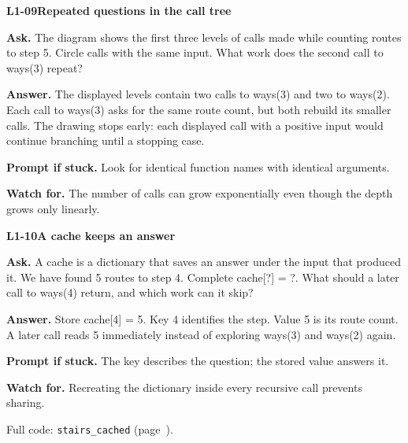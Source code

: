 \documentclass[11pt,a4paper]{article}
\begin{document}
\noindent\begin{minipage}{\textwidth}
{\color{teal}\textbf{L1-09}}\quad \textbf{Repeated questions in the call tree}\par\smallskip
\textbf{Ask.} The diagram shows the first three levels of calls made while counting routes to step 5. Circle calls with the same input. What work does the second call to ways(3) repeat?\par\smallskip
\textbf{Answer.} The displayed levels contain two calls to ways(3) and two to ways(2). Each call to ways(3) asks for the same route count, but both rebuild its smaller calls. The drawing stops early: each displayed call with a positive input would continue branching until a stopping case.\par\smallskip
\textbf{Prompt if stuck.} Look for identical function names with identical arguments.\par\smallskip
\textbf{Watch for.} The number of calls can grow exponentially even though the depth grows only linearly.
\end{minipage}\par{}\medskip

\noindent\begin{minipage}{\textwidth}
{\color{teal}\textbf{L1-10}}\quad \textbf{A cache keeps an answer}\par\smallskip
\textbf{Ask.} A cache is a dictionary that saves an answer under the input that produced it. We have found 5 routes to step 4. Complete cache[?] = ?. What should a later call to ways(4) return, and which work can it skip?\par\smallskip
\textbf{Answer.} Store cache[4] = 5. Key 4 identifies the step. Value 5 is its route count. A later call reads 5 immediately instead of exploring ways(3) and ways(2) again.\par\smallskip
\textbf{Prompt if stuck.} The key describes the question; the stored value answers it.\par\smallskip
\textbf{Watch for.} Recreating the dictionary inside every recursive call prevents sharing.\par\smallskip Full code: \texttt{stairs\_cached} (page~\pageref{L1-code-stairs_cached}).
\end{minipage}\par{}\medskip
\end{document}
